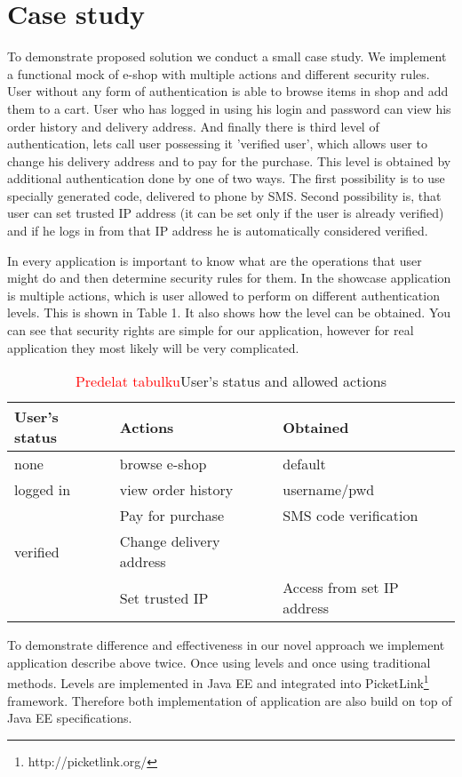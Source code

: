 \documentclass{sig-alternate}
\newcommand\todo[1]{\textcolor{red}{#1}}
\begin{document}
\section{Case study}
To demonstrate proposed solution we conduct a small case study. We implement a functional mock of e-shop with multiple actions and different security rules. User without any form of authentication is able to browse items in shop and add them to a cart. User who has logged in using his login and password can view his order history and delivery address. And finally there is third level of authentication, lets call user possessing it 'verified user', which allows user to change his delivery address and to pay for the purchase. This level is obtained by additional authentication done by one of two ways. The first possibility is to use specially generated code, delivered to phone by SMS. Second possibility is, that user can set trusted IP address (it can be set only if the user is already verified) and if he logs in from that IP address he is automatically considered verified.

In every application is important to know what are the operations that user might do and then determine security rules for them. In the showcase application is multiple actions, which is user allowed to perform on different authentication levels. This is shown in Table 1. It also shows how the level can be obtained. You can see that security rights are simple for our application, however for real application they most likely will be very complicated.

\begin{table}
\centering
\caption{\todo{Predelat tabulku}User's status and allowed actions}
\begin{tabular}{|m{2cm}|m{2.5cm}|m{3cm}|} \hline
User's status&Actions&Obtained\\ \hline
none & browse e-shop & default\\ \hline
logged in & view order \newline history & username/pwd\\ \hline
 &  Pay for purchase & SMS code verification \\ 
verified & Change delivery address &  \\ 
 & Set trusted IP & Access from set IP address\\ 
\hline\end{tabular}
\end{table}

To demonstrate difference and effectiveness in our novel approach we implement application describe above twice. Once using levels and once using traditional methods. Levels are implemented in Java EE and integrated into PicketLink\footnote{http://picketlink.org/} framework. Therefore both implementation of application are also build on top of Java EE specifications.
\end{document}
